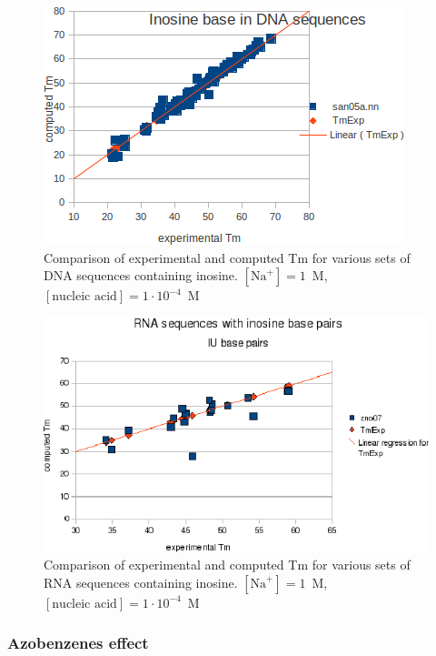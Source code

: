 \documentclass{article}
\begin{document}
\begin{figure}[h]
\includegraphics[width=1\linewidth]{images/DNAInosine}
\caption{Comparison of experimental and computed Tm for various sets of
 DNA sequences containing inosine. $[\mbox{Na}^+] = 1$~M, $[\mbox{nucleic acid}] = 1\cdot{}10^{-4}$~M}
\end{figure}

\begin{figure}[h]
\includegraphics[width=1\linewidth]{images/RNAInosine}
\caption{Comparison of experimental and computed Tm for various sets of
 RNA sequences containing inosine. $[\mbox{Na}^+] = 1$~M, $[\mbox{nucleic acid}] = 1\cdot{}10^{-4}$~M}
\end{figure}

\clearpage
\subsubsection{Azobenzenes effect}
\end{document}
